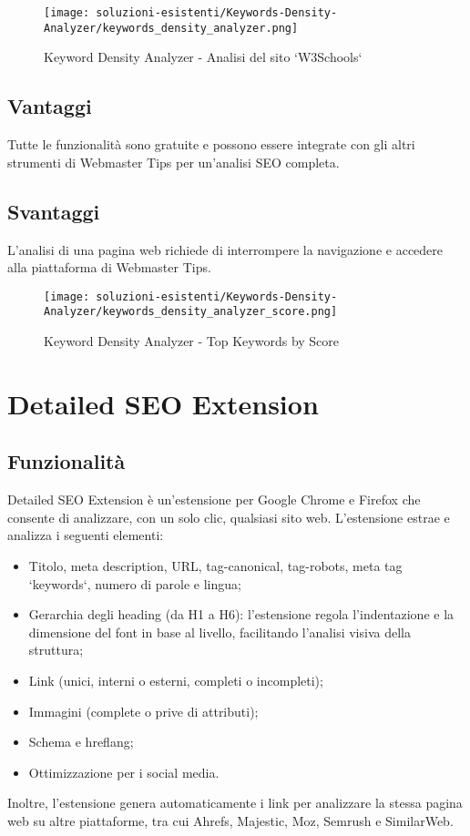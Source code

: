 \begin{figure}[H]
    \centering 
    \texttt{[image: soluzioni-esistenti/Keywords-Density-Analyzer/keywords\_density\_analyzer.png]} 
    \caption{Keyword Density Analyzer - Analisi del sito `W3Schools`}
\end{figure}

\subsection{Vantaggi}
\par Tutte le funzionalità sono gratuite e possono essere integrate con gli altri strumenti di Webmaster Tips per un'analisi SEO completa.

\subsection{Svantaggi}
\par L'analisi di una pagina web richiede di interrompere la navigazione e accedere alla piattaforma di Webmaster Tips.

\begin{figure}[H]
    \centering 
    \texttt{[image: soluzioni-esistenti/Keywords-Density-Analyzer/keywords\_density\_analyzer\_score.png]} 
    \caption{Keyword Density Analyzer - Top Keywords by Score}
\end{figure}

\section{Detailed SEO Extension}

\subsection{Funzionalità}
\par Detailed SEO Extension è un'estensione per Google Chrome e Firefox che consente di analizzare, con un solo clic, qualsiasi sito web. L'estensione estrae e analizza i seguenti elementi:
\begin{itemize}
    \item Titolo, meta description, URL, \gls{tag-canonical}, \gls{tag-robots}, meta tag `keywords`, numero di parole e lingua;
    \item Gerarchia degli heading (da H1 a H6): l'estensione regola l'indentazione e la dimensione del font in base al livello, facilitando l'analisi visiva della struttura;
    \item Link (unici, interni o esterni, completi o incompleti);
    \item Immagini (complete o prive di attributi);
    \item Schema e \gls{hreflang};
    \item Ottimizzazione per i social media.
\end{itemize}
Inoltre, l'estensione genera automaticamente i link per analizzare la stessa pagina web su altre piattaforme, tra cui Ahrefs, Majestic, Moz, Semrush e SimilarWeb.

